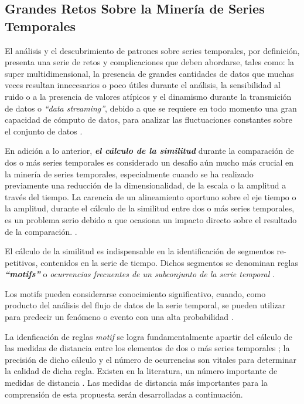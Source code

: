 \subsection{Grandes Retos Sobre la Miner\'ia de Series Temporales}
El an\'alisis y el descubrimiento de patrones sobre series temporales, por definici\'on, presenta una serie de retos y complicaciones que deben abordarse, tales como: la super multidimensional, la presencia de grandes cantidades de datos que muchas veces resultan innecesarios o poco \'utiles durante el an\'alisis, la sensibilidad al ruido o a la presencia de valores at\'ipicos y el dinamismo durante la transmici\'on de datos o \textit{\enquote{data streaming}}, debido a que se requiere en todo momento una gran capacidad de c\'omputo de datos, para analizar las fluctuaciones constantes sobre el conjunto de datos \cite{main}.\par
En adici\'on a lo anterior, \textit{\textbf{el c\'alculo de la similitud}} durante la comparaci\'on de dos o m\'as series temporales es considerado un desaf\'io a\'un mucho m\'as crucial en la miner\'ia de series temporales, especialmente cuando se ha realizado previamente una reducci\'on de la dimensionalidad, de la escala o la amplitud a trav\'es del tiempo. La carencia de un alineamiento oportuno sobre el eje tiempo o la amplitud, durante el c\'alculo de la similitud entre dos o m\'as series temporales, es un problema serio debido a que ocasiona un impacto directo sobre el resultado de la comparaci\'on. \cite{concepts}.\par
El c\'alculo de la similitud es indispensable en la identificaci\'on de segmentos re-petitivos, contenidos en la serie de tiempo. Dichos segmentos se denominan reglas \textit{\textbf{\enquote{motifs}}} o \textit{ocurrencias frecuentes de un subconjunto de la serie temporal} \cite{main}.\par
Los motifs pueden considerarse conocimiento significativo, cuando, como producto del an\'alisis del flujo de datos de la serie temporal, se pueden utilizar para predecir un fen\'omeno o evento con una alta probabilidad \cite{main}.\par
La idenficaci\'on de reglas \textit{motif} se logra fundamentalmente apartir del c\'alculo de las medidas de distancia entre los elementos de dos o m\'as series temporales \cite{main}; la precisi\'on de dicho c\'alculo y el n\'umero de ocurrencias son vitales para determinar la calidad de dicha regla. Existen en la literatura, un n\'umero importante de medidas de distancia \cite{distancecomparison}. Las medidas de distancia m\'as importantes para la comprensi\'on de esta propuesta ser\'an desarrolladas a continuaci\'on.
